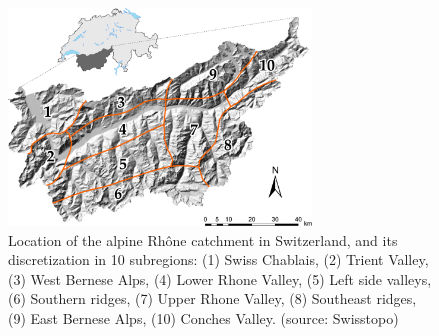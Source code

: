 \documentclass{ametsoc}
\begin{document}

%
%
%



%




%


\begin{figure}[t]
	\centerline{\includegraphics[width=19pc,angle=0]{fig01.pdf}}
	\caption{Location of the alpine Rh\^{o}ne catchment in Switzerland, and its discretization in 10 subregions:	(1) Swiss Chablais, (2) Trient Valley, (3) West Bernese Alps, (4) Lower Rhone Valley, (5) Left side valleys, (6) Southern ridges, (7) Upper Rhone Valley, (8) Southeast ridges, (9) East Bernese Alps, (10) Conches Valley. (source: Swisstopo)}
	\label{fig:map}
\end{figure}
\end{document}
